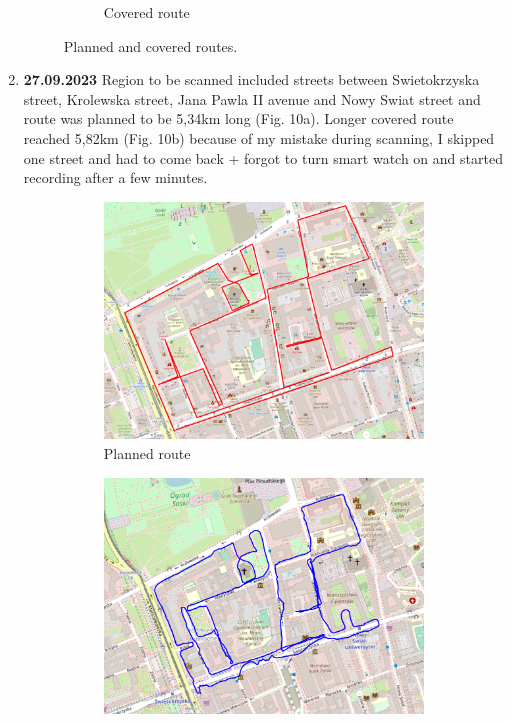 \documentclass[a4paper,12pt]{article}
\begin{document}
\begin{enumerate}
\begin{figure}[H]
\begin{subfigure}{.83\textwidth}
			\caption{Covered route}
			\label{fig:b8}
		\end{subfigure}
		\caption{Planned and covered routes.}
		\label{fig:fig8}
	\end{figure} 
	\item \textbf{27.09.2023} Region to be scanned included streets between Swietokrzyska street, Krolewska street, Jana Pawla II avenue and Nowy Swiat street and route was planned to be 5,34km long (Fig. 10a). Longer covered route reached 5,82km (Fig. 10b) because of my mistake during scanning, I skipped one street and had to come back + forgot to turn smart watch on and started recording after a few minutes.
	\begin{figure}[H]
		\centering
		\begin{subfigure}{.93\textwidth}
			\centering
			\includegraphics[width=1\linewidth]{route_p9}
			\caption{Planned route}
			\label{fig:a9}
		\end{subfigure}%
		\linebreak
		\begin{subfigure}{.93\textwidth}
			\centering
			\includegraphics[width=1\linewidth]{route_c9}

\end{subfigure}
\end{figure}
\end{enumerate}
\end{document}

